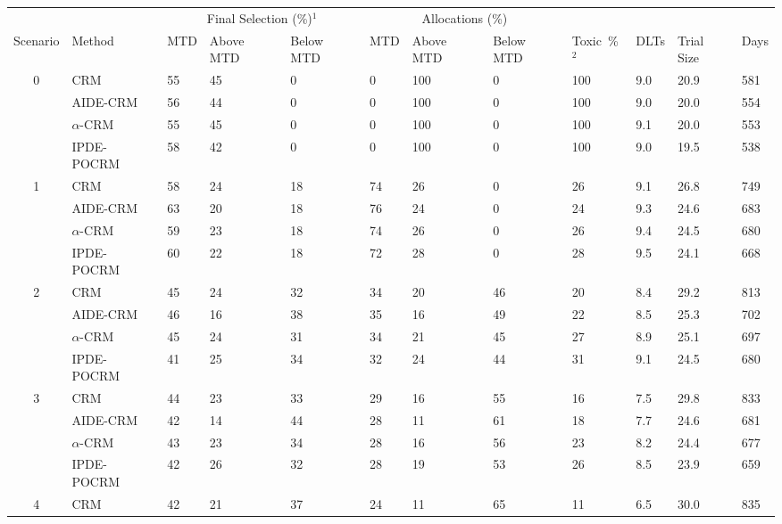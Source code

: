\begin{tabular*}{\textwidth}{@{\extracolsep\fill}clllllllllll@{\extracolsep\fill}}
\toprule
&  & \multicolumn{3}{c}{Final Selection (\%)$^1$} & \multicolumn{3}{c}{Allocations (\%)} & &  &  &  \\
\multirow{2}{2em}{Scenario} & \multirow{2}{2em}{Method} & \multirow{2}{2em}{MTD} & \multirow{2}{2em}{Above MTD} & \multirow{2}{2em}{Below MTD} & \multirow{2}{2em}{MTD} & \multirow{2}{2em}{Above MTD} & \multirow{2}{2em}{Below MTD} & \multirow{2}{2em}{Toxic~\%$^2$} & \multirow{2}{2em}{DLTs} & \multirow{2}{2em}{Trial Size} & \multirow{2}{2em}{Days}  \\ \\ 
\midrule
\multirow{4}{2em}{0} & CRM & 55 & 45 & 0 & 0 & 100 & 0 & 100 & 9.0 & 20.9 & 581\\
 & AIDE-CRM & 56 & 44 & 0 & 0 & 100 & 0 & 100 & 9.0 & 20.0 & 554\\
 & $\alpha$-CRM & 55 & 45 & 0 & 0 & 100 & 0 & 100 & 9.1 & 20.0 & 553\\
 & IPDE-POCRM & 58 & 42 & 0 & 0 & 100 & 0 & 100 & 9.0 & 19.5 & 538\\
\midrule
\multirow{4}{2em}{1} & CRM & 58 & 24 & 18 & 74 & 26 & 0 & 26 & 9.1 & 26.8 & 749\\
 & AIDE-CRM & 63 & 20 & 18 & 76 & 24 & 0 & 24 & 9.3 & 24.6 & 683\\
 & $\alpha$-CRM & 59 & 23 & 18 & 74 & 26 & 0 & 26 & 9.4 & 24.5 & 680\\
 & IPDE-POCRM & 60 & 22 & 18 & 72 & 28 & 0 & 28 & 9.5 & 24.1 & 668\\
\midrule
\multirow{4}{2em}{2} & CRM & 45 & 24 & 32 & 34 & 20 & 46 & 20 & 8.4 & 29.2 & 813\\
 & AIDE-CRM & 46 & 16 & 38 & 35 & 16 & 49 & 22 & 8.5 & 25.3 & 702\\
 & $\alpha$-CRM & 45 & 24 & 31 & 34 & 21 & 45 & 27 & 8.9 & 25.1 & 697\\
 & IPDE-POCRM & 41 & 25 & 34 & 32 & 24 & 44 & 31 & 9.1 & 24.5 & 680\\
\midrule
\multirow{4}{2em}{3} & CRM & 44 & 23 & 33 & 29 & 16 & 55 & 16 & 7.5 & 29.8 & 833\\
 & AIDE-CRM & 42 & 14 & 44 & 28 & 11 & 61 & 18 & 7.7 & 24.6 & 681\\
 & $\alpha$-CRM & 43 & 23 & 34 & 28 & 16 & 56 & 23 & 8.2 & 24.4 & 677\\
 & IPDE-POCRM & 42 & 26 & 32 & 28 & 19 & 53 & 26 & 8.5 & 23.9 & 659\\
\midrule
\multirow{4}{2em}{4} & CRM & 42 & 21 & 37 & 24 & 11 & 65 & 11 & 6.5 & 30.0 & 835\\

\end{tabular*}
